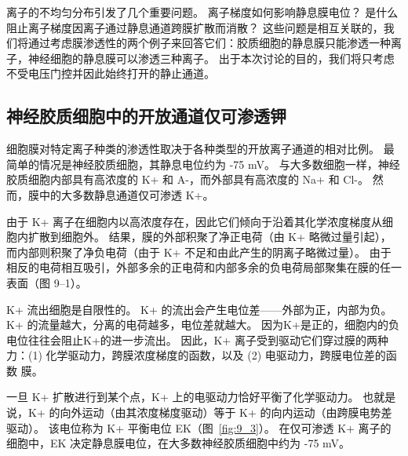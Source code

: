 离子的不均匀分布引发了几个重要问题。
离子梯度如何影响静息膜电位？
是什么阻止离子梯度因离子通过静息通道跨膜扩散而消散？
这些问题是相互关联的，我们将通过考虑膜渗透性的两个例子来回答它们：胶质细胞的静息膜只能渗透一种离子，神经细胞的静息膜可以渗透三种离子。
出于本次讨论的目的，我们将只考虑不受电压门控并因此始终打开的静止通道。



\subsection{神经胶质细胞中的开放通道仅可渗透钾}

细胞膜对特定离子种类的渗透性取决于各种类型的开放离子通道的相对比例。
最简单的情况是神经胶质细胞，其静息电位约为 -75 mV。
与大多数细胞一样，神经胶质细胞内部具有高浓度的 K+ 和 A-，而外部具有高浓度的 Na+ 和 Cl-。
然而，膜中的大多数静息通道仅可渗透 K+。


由于 K+ 离子在细胞内以高浓度存在，因此它们倾向于沿着其化学浓度梯度从细胞内扩散到细胞外。
结果，膜的外部积聚了净正电荷（由 K+ 略微过量引起），而内部则积聚了净负电荷（由于 K+ 不足和由此产生的阴离子略微过量）。
由于相反的电荷相互吸引，外部多余的正电荷和内部多余的负电荷局部聚集在膜的任一表面（图 9–1）。


K+ 流出细胞是自限性的。
K+ 的流出会产生电位差——外部为正，内部为负。
K+ 的流量越大，分离的电荷越多，电位差就越大。
因为K+是正的，细胞内的负电位往往会阻止K+的进一步流出。
因此，K+ 离子受到驱动它们穿过膜的两种力：(1) 化学驱动力，跨膜浓度梯度的函数，以及 (2) 电驱动力，跨膜电位差的函数 膜。


一旦 K+ 扩散进行到某个点，K+ 上的电驱动力恰好平衡了化学驱动力。
也就是说，K+ 的向外运动（由其浓度梯度驱动）等于 K+ 的向内运动（由跨膜电势差驱动）。
该电位称为 K+ 平衡电位 EK（图~\ref{fig:9_3}）。
在仅可渗透 K+ 离子的细胞中，EK 决定静息膜电位，在大多数神经胶质细胞中约为 -75 mV。


